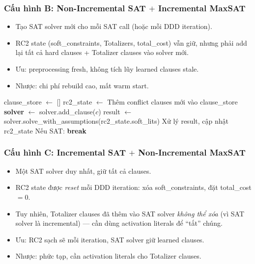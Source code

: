 \documentclass[11pt,a4paper]{article}
\begin{document}
\subsubsection{Cấu hình B: Non-Incremental SAT $+$ Incremental MaxSAT}

\begin{itemize}
  \item Tạo SAT solver mới cho mỗi SAT call (hoặc mỗi DDD iteration).
  \item RC2 state (soft\_constraints, Totalizers, total\_cost) vẫn giữ, nhưng phải add lại tất cả hard clauses + Totalizer clauses vào solver mới.
  \item Ưu: preprocessing fresh, không tích lũy learned clauses stale.
  \item Nhược: chi phí rebuild cao, mất warm start.
\end{itemize}

\begin{algorithm}[H]
\caption{Cấu hình B: Non-Incremental SAT $+$ Incremental MaxSAT}
\begin{algorithmic}[1]
\State clause\_store $\gets$ [] 
\State rc2\_state $\gets$  
\Loop {}
  \State Thêm conflict clauses mới vào clause\_store
  \Loop {}
    \State \textbf{solver} $\gets$  
      solver.add\_clause($c$)
    \EndFor
    \State result $\gets$ solver.solve\_with\_assumptions(rc2\_state.soft\_lits)
    \State Xử lý result, cập nhật rc2\_state
    \State Nếu SAT: \textbf{break}
  \EndLoop
\EndLoop
\end{algorithmic}
\end{algorithm}

\subsubsection{Cấu hình C: Incremental SAT $+$ Non-Incremental MaxSAT}

\begin{itemize}
  \item Một SAT solver duy nhất, giữ tất cả clauses.
  \item RC2 state được \emph{reset} mỗi DDD iteration: xóa soft\_constraints, đặt total\_cost $= 0$.
  \item Tuy nhiên, Totalizer clauses đã thêm vào SAT solver \emph{không thể xóa} (vì SAT solver là incremental) --- cần dùng activation literals để ``tắt'' chúng.
  \item Ưu: RC2 sạch sẽ mỗi iteration, SAT solver giữ learned clauses.
  \item Nhược: phức tạp, cần activation literals cho Totalizer clauses.
\end{itemize}
\end{document}
